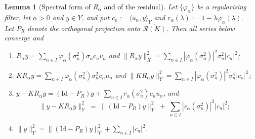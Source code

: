 \documentclass[a4paper]{report}
\theoremstyle{plain}
\newtheorem{lemma}[theorem]{Lemma}
\theoremstyle{definition}
\theoremstyle{remark}
\newcommand{\Ran}{\mathcal{R}}
\newcommand{\Id}{\mathrm{Id}}
\begin{document}
\begin{lemma}[Spectral form of $R_{\alpha}$ and of the residual]
  \label{lem_spectral_residual_form}
  Let $\{\varphi_{\alpha}\}$ be a regularizing filter, let $\alpha > 0$ and $y \in Y$,
  and put $c_n := \langle u_n, y\rangle_Y$ and $r_{\alpha}(\lambda) := 1 -
  \lambda\varphi_{\alpha}(\lambda)$.  Let $P_R$ denote the orthogonal projection onto
  $\overline{\Ran(K)}$.  Then all series below converge and
  \begin{enumerate}
    \item $R_{\alpha}y = \sum_{n \in I}\varphi_{\alpha}(\sigma_n^{2})\sigma_nc_nv_n$ and
      $\|R_{\alpha}y\|_X^{2} = \sum_{n \in I}|\varphi_{\alpha}(\sigma_n^{2})|^{2}
      \sigma_n^{2}|c_n|^{2}$;
    \item $KR_{\alpha}y = \sum_{n \in I}\varphi_{\alpha}(\sigma_n^{2})\sigma_n^{2}
      c_nu_n$ and $\|KR_{\alpha}y\|_Y^{2} = \sum_{n \in I}
      |\varphi_{\alpha}(\sigma_n^{2})|^{2}\sigma_n^{4}|c_n|^{2}$;
    \item $y - KR_{\alpha}y = (\Id - P_R)y + \sum_{n \in I}r_{\alpha}(\sigma_n^{2})
      c_nu_n$, and
      \[
        \|y - KR_{\alpha}y\|_Y^{2} \;=\; \|(\Id - P_R)y\|_Y^{2}
          \;+\; \sum_{n \in I}|r_{\alpha}(\sigma_n^{2})|^{2}|c_n|^{2} ;
      \]
    \item $\|y\|_Y^{2} = \|(\Id - P_R)y\|_Y^{2} + \sum_{n \in I}|c_n|^{2}$.
  \end{enumerate}
\end{lemma}
\end{document}
